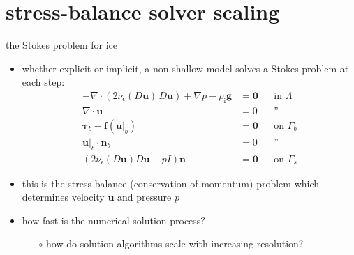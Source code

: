 \documentclass[svgnames,
               hyperref={colorlinks,citecolor=DeepPink4,linkcolor=FireBrick,urlcolor=Maroon},
               usepdftitle=false]  %
               {beamer}
\newcommand{\eps}{\epsilon}
\newcommand{\bbf}{\mathbf{f}}
\newcommand{\bn}{\mathbf{n}}
\newcommand{\bu}{\mathbf{u}}
\newcommand{\btau}{\bm{\tau}}
\newcommand{\bzero}{\bm{0}}
\newcommand{\rhoi}{\rho_{\text{i}}}
\begin{document}
\section{stress-balance solver scaling}

\begin{frame}{the Stokes problem for ice}

\begin{itemize}
\item whether explicit or implicit, a non-shallow model solves a Stokes problem at each step:
\begin{align*}
- \nabla \cdot \left(2 \nu_\eps(D\bu)\, D\bu\right) + \nabla p - \rhoi \mathbf{g} &= \bzero && \text{in $\Lambda$} \\
\nabla \cdot \bu &= 0 && \text{''} \\
\btau_b - \bbf(\bu|_b) &= \bzero && \text{on $\Gamma_b$} \\
\bu|_b \cdot \bn_b &= 0 && \text{''} \\
\left(2 \nu_\eps(D\bu) D\bu - pI\right) \bn &= \bzero && \text{on $\Gamma_s$}
\end{align*}
\item this is the \alert{stress balance} (conservation of momentum) problem which determines velocity $\bu$ and pressure $p$
\item how fast is the numerical solution process?
    \begin{itemize}
    \item[$\circ$] how do solution algorithms \alert{scale with increasing resolution}?
    \end{itemize}
\end{itemize}
\end{frame}
\end{document}
